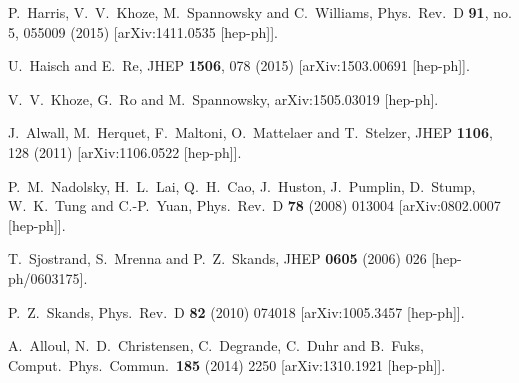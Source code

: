 \documentclass[preprintnumbers,superscriptaddress,nofootinbib,aps,prd,floatfix]{revtex4}
\begin{document}
\begin{thebibliography}{99}
  P.~Harris, V.~V.~Khoze, M.~Spannowsky and C.~Williams,
  Phys.\ Rev.\ D {\bf 91}, no. 5, 055009 (2015)
  [arXiv:1411.0535 [hep-ph]].

  U.~Haisch and E.~Re,
  JHEP {\bf 1506}, 078 (2015)
  [arXiv:1503.00691 [hep-ph]].
  
  V.~V.~Khoze, G.~Ro and M.~Spannowsky,
  arXiv:1505.03019 [hep-ph].

  J.~Alwall, M.~Herquet, F.~Maltoni, O.~Mattelaer and T.~Stelzer,
  JHEP {\bf 1106}, 128 (2011)
  [arXiv:1106.0522 [hep-ph]].
 
  P.~M.~Nadolsky, H.~L.~Lai, Q.~H.~Cao, J.~Huston, J.~Pumplin, D.~Stump, W.~K.~Tung and C.-P.~Yuan,
  Phys.\ Rev.\ D {\bf 78} (2008) 013004
  [arXiv:0802.0007 [hep-ph]].

  T.~Sjostrand, S.~Mrenna and P.~Z.~Skands,
  JHEP {\bf 0605} (2006) 026
  [hep-ph/0603175].
  
  P.~Z.~Skands,
  Phys.\ Rev.\ D {\bf 82} (2010) 074018
  [arXiv:1005.3457 [hep-ph]].

  A.~Alloul, N.~D.~Christensen, C.~Degrande, C.~Duhr and B.~Fuks,
  Comput.\ Phys.\ Commun.\  {\bf 185} (2014) 2250
  [arXiv:1310.1921 [hep-ph]].


\end{thebibliography}
\end{document}
